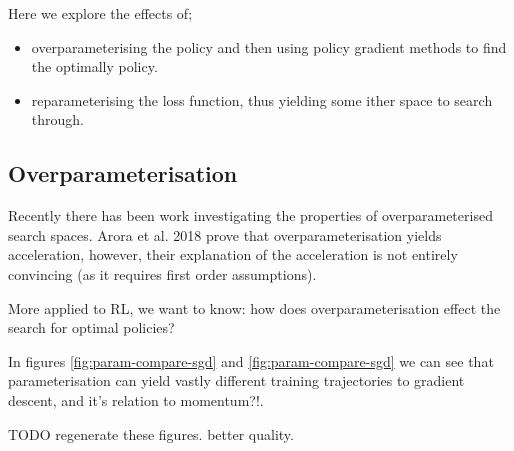 Here we explore the effects of;
\begin{itemize}
\tightlist
  \item overparameterising the policy and then using policy gradient methods to find the optimally policy.
  \item reparameterising the loss function, thus yielding some ither space to search through.
\end{itemize}




\subsection{Overparameterisation}

Recently there has been work investigating the properties of overparameterised search spaces.
Arora et al. 2018 \cite{Arora2018} prove that overparameterisation yields acceleration, however,
their explanation of the acceleration is not entirely convincing (as it requires first order assumptions).

More applied to RL, we want to know: how does overparameterisation effect the search for optimal policies?

In figures \ref{fig:param-compare-sgd} and \ref{fig:param-compare-sgd} we can see that
parameterisation can yield vastly different training trajectories to gradient descent,
{\color{red}and it's relation to momentum?!}\footnotemark.


{\color{red}TODO regenerate these figures. better quality.}

